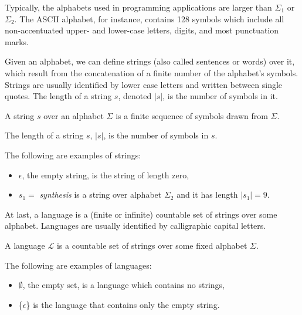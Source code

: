 Typically, the alphabets used in programming applications are larger than \(\Sigma_1\) or \(\Sigma_2\). The ASCII alphabet, for instance, contains 128 symbols which include all non-accentuated upper- and lower-case letters, digits, and most punctuation marks.

Given an alphabet, we can define strings (also called sentences or words) over it, which result from the concatenation of a finite number of the alphabet's symbols. Strings are usually identified by lower case letters and written between single quotes. The length of a string \(s\), denoted \(|s|\), is the number of symbols in it.

\begin{definition}[String]
A string \(s\) over an alphabet \(\Sigma\) is a finite sequence of symbols drawn from \(\Sigma\).
\end{definition}

\begin{definition}
The length of a string \(s\), \(|s|\), is the number of symbols in \(s\).
\end{definition}

\begin{example}
The following are examples of strings:
\begin{itemize}
\item \(\epsilon\), the empty string, is the string of length zero,\par
\item \(s_1 = \) \textit{synthesis} is a string over alphabet \(\Sigma_2\) and it has length \(|s_1| = 9\).
\end{itemize}
\end{example}

At last, a language is a (finite or infinite) countable set of strings over some alphabet. Languages are usually identified by calligraphic capital letters.

\begin{definition}[Language]
A language \(\mathcal{L}\) is a countable set of strings over some fixed alphabet \(\Sigma\).
\end{definition}

\begin{example}
The following are examples of languages:
\begin{itemize}
\item \(\emptyset\), the empty set, is a language which contains no strings,\par
\item \{\(\epsilon\)\} is the language that contains only the empty string.
\end{itemize}
\end{example}


